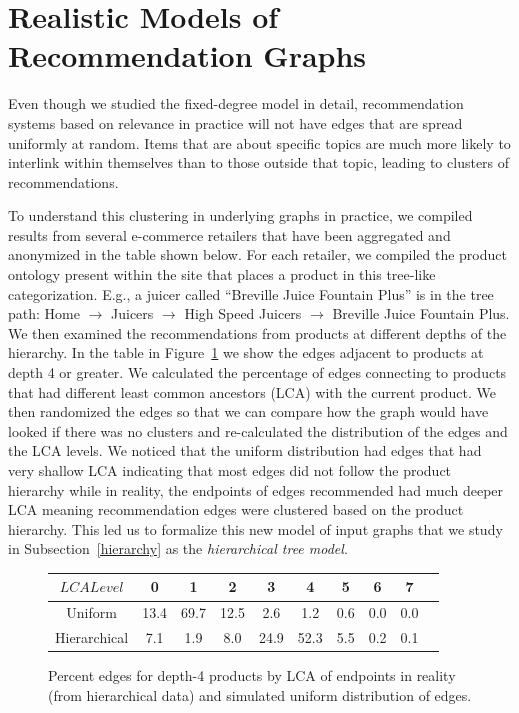 \section{Realistic Models of Recommendation Graphs}
Even though we studied the fixed-degree model in detail, recommendation systems based on relevance in practice
will not have edges that are spread uniformly at random. Items that are
about specific topics are much more likely to interlink within
themselves than to those outside that topic, leading to
clusters of recommendations.

To understand this clustering in underlying
graphs in practice, we compiled results from several e-commerce retailers that
have been aggregated and anonymized in the table shown below. For each
retailer, we compiled the product ontology present within the
site that places a product in this tree-like categorization. E.g., a
juicer called ``Breville Juice Fountain Plus'' is in the tree path:
Home $\rightarrow$ Juicers $\rightarrow$ High Speed Juicers
$\rightarrow$ Breville Juice Fountain Plus. We then examined the
recommendations from products at different depths of the hierarchy. In
the table in Figure~\ref{fig:hier} we show the edges adjacent to
products at depth 4 or greater. We calculated the percentage of edges
connecting to products that had different least common ancestors (LCA) with the current product.  We
then randomized the edges so that we can compare how the graph would
have looked if there was no clusters and re-calculated the
distribution of the edges and the LCA levels. We noticed that the
uniform distribution had edges that had very shallow LCA indicating that
most edges did not follow the product hierarchy while in reality,
the endpoints of edges recommended had much deeper LCA meaning recommendation edges were clustered based on the product hierarchy. This led us
to formalize this new model of input graphs that we study in Subsection~\ref{hierarchy}
as the {\em hierarchical tree model}.

\begin{figure}[h]
  \centering
  \begin{tabular}{ |c|c|c|c|c|c|c|c|c|c| }
    \hline
    $LCA Level$ & 0 & 1 & 2 & 3 & 4 & 5 & 6 & 7 \\ \hline
    Uniform & 13.4 & 69.7 & 12.5 & 2.6 & 1.2 & 0.6 & 0.0 & 0.0 \\ \hline
    Hierarchical & 7.1 & 1.9 & 8.0 & 24.9 & 52.3 & 5.5 & 0.2 & 0.1\\
    \hline
  \end{tabular}
  \caption{Percent edges for depth-4 products by LCA of endpoints in reality (from hierarchical data) and simulated uniform distribution of edges.}\label{fig:hier}
\end{figure}

